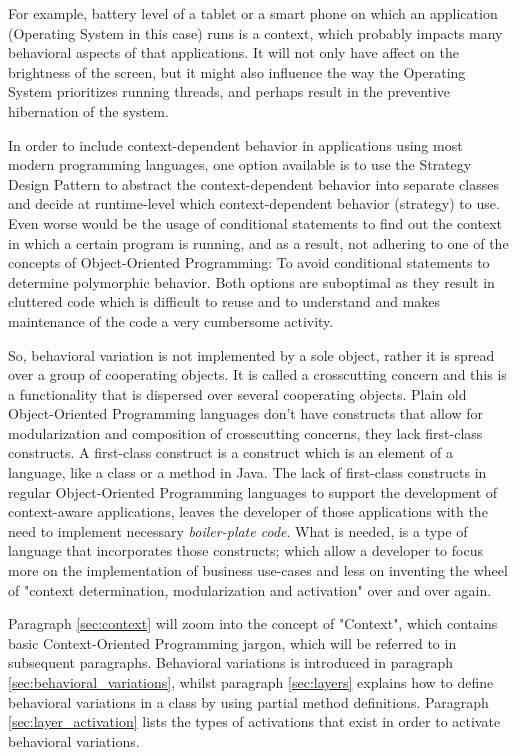 \documentclass{acm_proc_article-sp}
\begin{document}
For example, battery level of a tablet or a smart phone on which an application (Operating System in this case) runs is a context, which probably impacts many behavioral aspects of that applications. It will not only have affect on the brightness of the screen, but it might also influence the way the Operating System prioritizes running threads, and perhaps result in the preventive hibernation of the system.

In order to include context-dependent behavior in applications using most modern programming languages, one option available is to use the Strategy Design Pattern \cite{strategypattern} to abstract the context-dependent behavior into separate classes and decide at runtime-level which context-dependent behavior (strategy) to use. Even worse would be the usage of conditional statements to find out the context in which a certain program is running, and as a result, not adhering to one of the concepts of Object-Oriented Programming: To avoid conditional statements to determine polymorphic behavior. Both options are suboptimal as they result in cluttered code which is difficult to reuse and to understand and makes maintenance of the code a very cumbersome activity.

So, behavioral variation is not implemented by a sole object, rather it is spread over a group of cooperating objects. It is called a crosscutting concern \cite{kiczalesetallaop} and this is a functionality that is dispersed over several cooperating objects. Plain old Object-Oriented Programming languages don't have constructs that allow for modularization and composition of crosscutting concerns, they lack first-class constructs. A first-class construct \cite{Keays:2003:CP:940923.940926} is a construct which is an element of a language, like a class or a method in Java. The lack of first-class constructs in regular Object-Oriented Programming languages to support the development of context-aware applications, leaves the developer of those applications with the need to implement necessary \textit{boiler-plate code}. What is needed, is a type of language that incorporates those constructs; which allow a developer to focus more on the implementation of business use-cases and less on inventing the wheel of "context determination, modularization and activation" over and over again. 

Paragraph \ref{sec:context} will zoom into the concept of "Context", which contains basic Context-Oriented Programming jargon, which will be referred to in subsequent paragraphs. Behavioral variations is introduced in paragraph \ref{sec:behavioral_variations}, whilst paragraph \ref{sec:layers} explains how to define behavioral variations in a class by using partial method definitions. Paragraph \ref{sec:layer_activation} lists the types of activations that exist in order to activate behavioral variations. 
\end{document}
